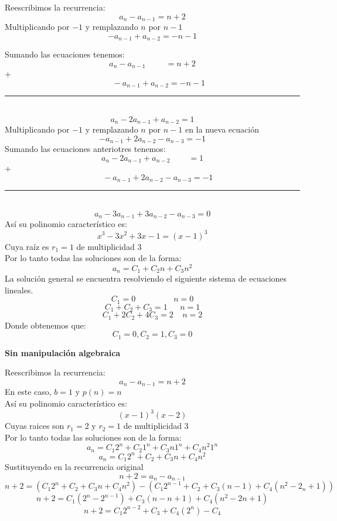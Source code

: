 \documentclass{article}
\theoremstyle{definition}
\theoremstyle{remark}
\begin{document}
\begin{enumerate}[1.]
Reescribimos la recurrencia: \\
$$a_{n}-a_{n-1}=n+2$$
Multiplicando por $-1$ y remplazando $n$ por $n-1$\\
$$-a_{n-1}+a_{n-2}=-n-1$$

Sumando las ecuaciones tenemos:\\
$$a_{n}-a_{n-1}~~~~~~~~~~~=n+2$$
+
$$~~~~~~~-a_{n-1}+a_{n-2}=-n-1$$
\rule{130mm}{0.1mm}\\
$$a_{n}-2a_{n-1}+a_{n-2}=1$$
Multiplicando por $-1$ y remplazando $n$ por $n-1$ en la nueva ecuaci\'on\\
$$-a_{n-1}+2a_{n-2}-a_{n-3}=-1$$
Sumando las ecuaciones anteriotres tenemos:\\
$$a_{n}-2a_{n-1}+a_{n-2}~~~~~~~~~~=1$$
+
$$~~~~~~-a_{n-1}+2a_{n-2}-a_{n-3}=-1$$
\rule{130mm}{0.1mm}\\
$$a_{n}-3a_{n-1}+3a_{n-2}-a_{n-3}=0$$
As\'i su polinomio caracter\'istico es:\\
$$ x^{3}-3x^{2}+3x-1= (x-1)^{3}$$
Cuya ra\'iz es $r_{1}=1$ de multiplicidad 3\\
Por lo tanto todas las soluciones son de la forma:\\
$$a_{n}=C_{1}+C_{2}n+C_{3}n^{2}$$
\clearpage
La soluci\'on general se encuentra resolviendo el siguiente sistema de ecuaciones lineales.\\
$$C_{1}=0~~~~~~~~~~~~~~~~~~~~~n=0$$
$$C_{1}+C_{2}+C_{3}=1~~~~~~~n=1$$
$$C_{1}+2C_{2}+4C_{3}=2~~~~~n=2$$
Donde obtenemos que:\\
$$C_{1}=0, C_{2}=1,  C_{3}=0$$
\clearpage



\begin{center}
\textbf{Sin manipulaci\'on algebraica}\\
\end{center}

Reescribimos la recurrencia: \\
$$a_{n}-a_{n-1}=n+2$$
En este caso, $b=1$ y $p(n)=n$\\
As\'i su polinomio caracter\'istico es:\\
$$(x-1)^{3}(x-2)$$
Cuyas raices son $r_{1}=2$ y $r_{2}=1$ de multiplicidad 3 \\
Por lo tanto todas las soluciones son de la forma:\\
$$a_{n}=C_{1}2^{n}+C_{2}1^{n}+C_{3}n1^{n}+C_{4}n^{2}1^{n} $$
$$a_{n}=C_{1}2^{n}+C_{2}+C_{3}n+C_{4}n^{2}$$
Sustituyendo en la recurrencia original\\
$$n+2= a_{n}-a_{n-1}$$
$$n+2=(C_{1}2^{n}+C_{2}+C_{3}n+C_{4}n^{2})-(C_{1}2^{n-1}+C_{2}+C_{3}(n-1)+C_{4}(n^{2}-2_{n}+1))$$
$$n+2=C_{1}(2^{n} - 2^{n-1})+C_{3}(n-n+1)+C_{4}(n^{2}-2n+1) $$
$$n+2=C_{1}2^{n-2}+C_{3}+C_{4}(2^{n})-C_{4}$$
\clearpage




\end{enumerate}
\end{document}
